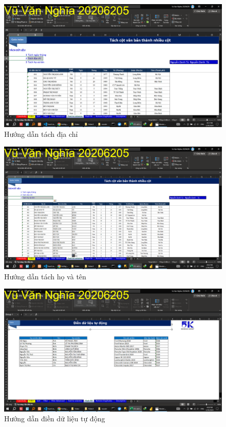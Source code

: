 \documentclass{article}
\begin{document}
\begin{figure}[H]
    \centering
    \includegraphics[scale = 0.15]{Video1/HuongDan/9.png}
    \caption{Hướng dẫn tách địa chỉ}
\end{figure}



\begin{figure}[H]
    \centering
    \includegraphics[scale = 0.15]{Video1/HuongDan/10.png}
    \caption{Hướng dẫn tách họ và tên}
\end{figure}




\begin{figure}[H]
    \centering
    \includegraphics[scale = 0.15]{Video1/HuongDan/11.png}
    \caption{Hướng dẫn điền dữ liệu tự động}
\end{figure}
\end{document}
